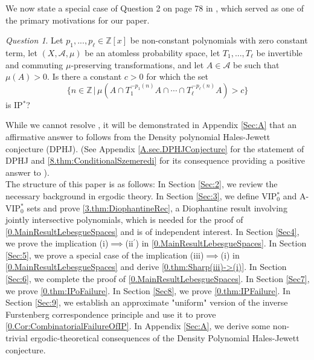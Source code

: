 \documentclass[11pt,american,preprint]{elsarticle}
\numberwithin{equation}{section}
\theoremstyle{plain}
\theoremstyle{plain*}
\theoremstyle{plain}
\theoremstyle{plain*}
\theoremstyle{plain}
\theoremstyle{plain*}
\theoremstyle{remark}
\newtheorem{question}[thm]{Question}
\theoremstyle{remark*}
\theoremstyle{remark}
\theoremstyle{remark*}
\theoremstyle{remark}
\theoremstyle{remark*}
\theoremstyle{plain}
\theoremstyle{definition}
\theoremstyle{plain}
\theoremstyle{plain} %
\newcommand{\Z}{\mathbb{Z}}
\begin{document}
We now state a special case of Question 2 on page 78 in \cite{berMcCuIPPolySzemeredi}, which served as one of the primary motivations for our paper.
\begin{question}\label{0.question:IP*2}
    Let $p_1,...,p_\ell\in \Z[x]$ be non-constant polynomials with zero constant term, let $(X,\mathcal A,\mu)$ be an atomless probability space, let  $T_1,...,T_\ell$ be invertible and commuting $\mu$-preserving transformations,  and let $A\in\mathcal A$ be such that $\mu(A)>0$. Is there a constant $c>0$ for which the set 
    \begin{equation}\label{0.eq:StrongRec}  
        \{ n\in\Z\,|\,\mu(A\cap T_1^{-p_1(n)}A\cap \cdots\cap T_\ell^{-p_\ell(n)}A) > c\}
    \end{equation}
    is IP$^*$?
\end{question}
While we cannot resolve , it will be demonstrated in Appendix \ref{Sec:A} that an affirmative answer to 
follows from the Density polynomial Hales-Jewett conjecture (DPHJ). (See Appendix \ref{A.sec.DPHJConjecture} for the statement of DPHJ and \cref{8.thm:ConditionalSzemeredi} for its consequence providing a positive answer to ).\\

The structure of this paper is as follows: 
In Section \ref{Sec:2}, we review the necessary background in ergodic theory. 
In Section \ref{Sec:3}, we define VIP$_0^*$ and A-VIP$_0^*$ sets and prove \cref{3.thm:DiophantineRec}, a Diophantine result involving jointly intersective polynomials, which is needed for the proof of \cref{0.MainResultLebesgueSpaces} and is of independent interest.
In Section \ref{Sec4}, we prove the implication (i)$\implies$(ii$^\prime$) in \cref{0.MainResultLebesgueSpaces}.   In Section \ref{Sec:5}, we prove a special case of the implication (iii)$\implies$(i) in \cref{0.MainResultLebesgueSpaces} and derive \cref{0.thm:Sharp(iii)->(i)}.
In Section \ref{Sec:6}, we complete the proof of \cref{0.MainResultLebesgueSpaces}. 
In Section \ref{Sec7}, we prove \cref{0.thm:IPoFailure}. 
In Section \ref{Sec8}, we prove \cref{0.thm:IPFailure}. 
In Section \ref{Sec:9}, we establish an approximate "uniform" version of the inverse Furstenberg correspondence principle and use it to prove \cref{0.Cor:CombinatorialFailureOfIP}.
In Appendix \ref{Sec:A}, we derive some non-trivial ergodic-theoretical consequences of the 
 Density Polynomial Hales-Jewett conjecture.\\
\end{document}
